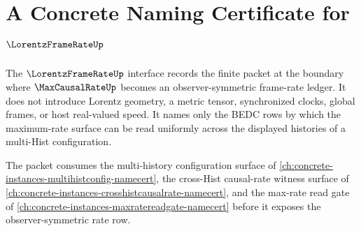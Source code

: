 \chapter{A Concrete Naming Certificate for $\LorentzFrameRateUp$}
\label{ch:concrete-instances-lorentz-frame-rate-namecert}

The $\LorentzFrameRateUp$ interface records the finite packet at the boundary where $\MaxCausalRateUp$ becomes an observer-symmetric frame-rate ledger. It does not introduce Lorentz geometry, a metric tensor, synchronized clocks, global frames, or host real-valued speed. It names only the BEDC rows by which the maximum-rate surface can be read uniformly across the displayed histories of a multi-Hist configuration.

The packet consumes the multi-history configuration surface of \autoref{ch:concrete-instances-multihistconfig-namecert}, the cross-Hist causal-rate witness surface of \autoref{ch:concrete-instances-crosshistcausalrate-namecert}, and the max-rate read gate of \autoref{ch:concrete-instances-maxratereadgate-namecert} before it exposes the observer-symmetric rate row.

